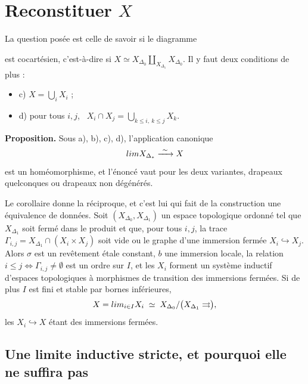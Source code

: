 \documentclass[11pt,a4paper]{article}
\begin{document}
\section*{Reconstituer $X$}

La question posée est celle de savoir si le diagramme


est cocartésien, c'est-à-dire si $X \simeq X_{\Delta_{0}}
\amalg_{X_{\Delta_{1}}} X_{\Delta_{0}}$. Il y faut deux conditions de plus :

\begin{itemize}
\item c) $X = \bigcup_{i} X_{i}$ ;
\item d) pour tous $i,j$, \ $X_{i} \cap X_{j} = \bigcup_{k \leq i,\ k \leq j} X_{k}$.
\end{itemize}

\textbf{Proposition.} Sous a), b), c), d), l'application canonique
\[
  \varinjlim X_{\Delta_{*}} \xrightarrow{\ \sim\ } X
\]
est un homéomorphisme, et l'énoncé vaut pour les deux variantes, drapeaux
quelconques ou drapeaux non dégénérés.

Le corollaire donne la réciproque, et c'est lui qui fait de la construction une
équivalence de données. Soit $(X_{\Delta_{0}}, X_{\Delta_{1}})$ un espace
topologique ordonné tel que $X_{\Delta_{1}}$ soit fermé dans le produit et que,
pour tous $i,j$, la trace $\Gamma_{i,j} = X_{\Delta_{1}} \cap (X_{i} \times
X_{j})$ soit vide ou le graphe d'une immersion fermée $X_{i} \hookrightarrow
X_{j}$. Alors $\sigma$ est un revêtement étale constant, $b$ une immersion
locale, la relation $i \leq j \iff \Gamma_{i,j} \neq \emptyset$ est un ordre sur
$I$, et les $X_{i}$ forment un système inductif d'espaces topologiques à
morphismes de transition des immersions fermées. Si de plus $I$ est fini et
stable par bornes inférieures,
\[
  X = \varinjlim_{i \in I} X_{i} \;\simeq\;
  X_{\Delta_{0}} / \bigl(X_{\Delta_{1}} \rightrightarrows\bigr),
\]
les $X_{i} \hookrightarrow X$ étant des immersions fermées.

\subsection*{Une limite inductive stricte, et pourquoi elle ne suffira pas}
\end{document}
